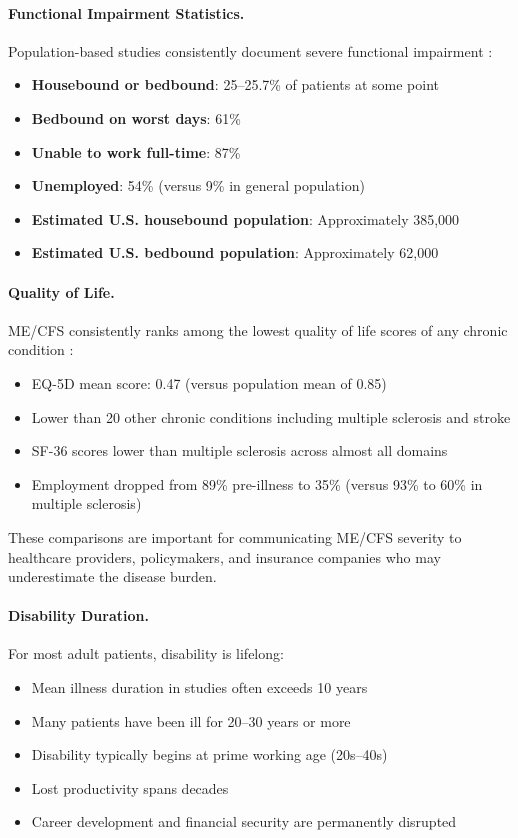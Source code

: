 \paragraph{Functional Impairment Statistics.}
Population-based studies consistently document severe functional impairment \cite{Pendergrast2020housebound}:
\begin{itemize}
    \item \textbf{Housebound or bedbound}: 25--25.7\% of patients at some point
    \item \textbf{Bedbound on worst days}: 61\%
    \item \textbf{Unable to work full-time}: 87\%
    \item \textbf{Unemployed}: 54\% (versus 9\% in general population)
    \item \textbf{Estimated U.S. housebound population}: Approximately 385,000
    \item \textbf{Estimated U.S. bedbound population}: Approximately 62,000
\end{itemize}

\paragraph{Quality of Life.}
ME/CFS consistently ranks among the lowest quality of life scores of any chronic condition \cite{hvidberg2015quality, kingdon2018functional}:
\begin{itemize}
    \item EQ-5D mean score: 0.47 (versus population mean of 0.85)
    \item Lower than 20 other chronic conditions including multiple sclerosis and stroke
    \item SF-36 scores lower than multiple sclerosis across almost all domains
    \item Employment dropped from 89\% pre-illness to 35\% (versus 93\% to 60\% in multiple sclerosis)
\end{itemize}

These comparisons are important for communicating ME/CFS severity to healthcare providers, policymakers, and insurance companies who may underestimate the disease burden.

\paragraph{Disability Duration.}
For most adult patients, disability is lifelong:
\begin{itemize}
    \item Mean illness duration in studies often exceeds 10 years
    \item Many patients have been ill for 20--30 years or more
    \item Disability typically begins at prime working age (20s--40s)
    \item Lost productivity spans decades
    \item Career development and financial security are permanently disrupted
\end{itemize}

